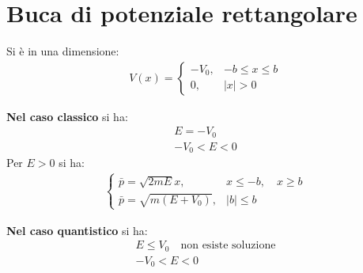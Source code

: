 \chapter{Buca di potenziale rettangolare} %
Si è in una dimensione:
\begin{equation}\begin{split}
V\left(x\right)=
\begin{cases}
-V_0, & -b\le x\le b \\
0, & |x|>0
\end{cases}
\end{split}\end{equation}

\textbf{Nel caso classico} si ha:
\begin{equation}\begin{split}
E=-V_0\\
-V_0<E<0
\end{split}\end{equation}
Per $E>0$ si ha:
\begin{equation}\begin{split}
\begin{cases}
\bar p=\sqrt{2mE} x, & x\le -b, \quad x\ge b \\
\bar p=\sqrt{m\left(E+V_0\right)}, & |b|\le b
\end{cases}
\end{split}\end{equation}

\textbf{Nel caso quantistico} si ha:
\begin{equation}\begin{split}
E\le V_0 \quad \textrm{non esiste soluzione} \\
-V_0<E<0
\end{split}\end{equation}

